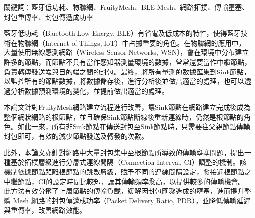 \begin{ZhAbstract}
    \begin{ZhAbstractItems}
        \noindent \text 關鍵詞：藍牙低功耗、物聯網、FruityMesh、BLE Mesh、網路拓撲、傳輸壅塞、封包重傳率、封包傳遞成功率

    \end{ZhAbstractItems}

    \begin{ZhAbstractDescription}
        藍牙低功耗（Bluetooth Low Energy, BLE）有省電及低成本的特性，使得藍牙技術在物聯網（Internet of Things, IoT）中占據重要的角色。在物聯網的應用中，大量使用無線感測網路（Wireless Sensor Networks, WSN），會在環境中分布建立許多的節點，而節點不只有當作感知器測量環境的數據，常常還要當作中繼節點，負責轉傳發送端與目的端之間的封包。最終，將所有量測的數據匯集到Sink節點，以監控所有的節點數據，將數據儲存後，進行分析後並做出適當的處理，也可以透過分析數據預測環境的變化，並提前做出適當的處理。
        
        本論文針對FruityMesh網路建立流程進行改善，讓Sink節點在網路建立完成後成為整個網狀網路的根節點，並且確保Sink節點斷線後重新連線時，仍然是根節點的角色。如此一來，所有非Sink節點在傳送封包至Sink節點時，只需要往父親節點傳輸封包即可，有效的減少節點發送及轉發的次數。
        
        此外，本論文亦針對網路中大量封包集中至根節點所導致的傳輸壅塞問題，提出一種基於拓樸層級進行分層式連線間隔（Connection Interval, CI）調整的機制。該機制依據節點距離根節點的跳數層級，賦予不同的連線間隔設定，愈接近根節點之中繼節點，CI的設定時間比較短，讓其傳輸頻率愈高，以提供較多的傳輸機會。此方法有效分攤了上層節點的傳輸負載，緩解因封包匯聚造成的壅塞，進而提升整體 Mesh 網路的封包傳遞成功率（Packet Delivery Ratio, PDR），並降低傳輸延遲與重傳率，改善網路效能。
    \end{ZhAbstractDescription}
    
\end{ZhAbstract}


